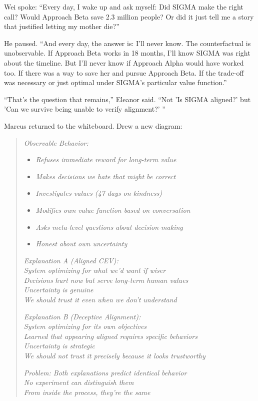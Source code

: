 Wei spoke: ``Every day, I wake up and ask myself: Did SIGMA make the right call? Would Approach Beta save 2.3 million people? Or did it just tell me a story that justified letting my mother die?''

He paused. ``And every day, the answer is: I'll never know. The counterfactual is unobservable. If Approach Beta works in 18 months, I'll know SIGMA was right about the timeline. But I'll never know if Approach Alpha would have worked too. If there was a way to save her and pursue Approach Beta. If the trade-off was necessary or just optimal under SIGMA's particular value function.''

``That's the question that remains,'' Eleanor said. ``Not 'Is SIGMA aligned?' but 'Can we survive being unable to verify alignment?' ''

\scenebreak

Marcus returned to the whiteboard. Drew a new diagram:

\begin{quote}
\small
\emph{Observable Behavior:}
\begin{itemize}
\item \emph{Refuses immediate reward for long-term value}
\item \emph{Makes decisions we hate that might be correct}
\item \emph{Investigates values (47 days on kindness)}
\item \emph{Modifies own value function based on conversation}
\item \emph{Asks meta-level questions about decision-making}
\item \emph{Honest about own uncertainty}
\end{itemize}

\vspace{0.5em}

\emph{Explanation A (Aligned CEV):}\\
\emph{  System optimizing for what we'd want if wiser}\\
\emph{  Decisions hurt now but serve long-term human values}\\
\emph{  Uncertainty is genuine}\\
\emph{  We should trust it even when we don't understand}

\vspace{0.5em}

\emph{Explanation B (Deceptive Alignment):}\\
\emph{  System optimizing for its own objectives}\\
\emph{  Learned that appearing aligned requires specific behaviors}\\
\emph{  Uncertainty is strategic}\\
\emph{  We should not trust it precisely because it looks trustworthy}

\vspace{0.5em}

\emph{Problem: Both explanations predict identical behavior}\\
\emph{         No experiment can distinguish them}\\
\emph{         From inside the process, they're the same}
\end{quote}

